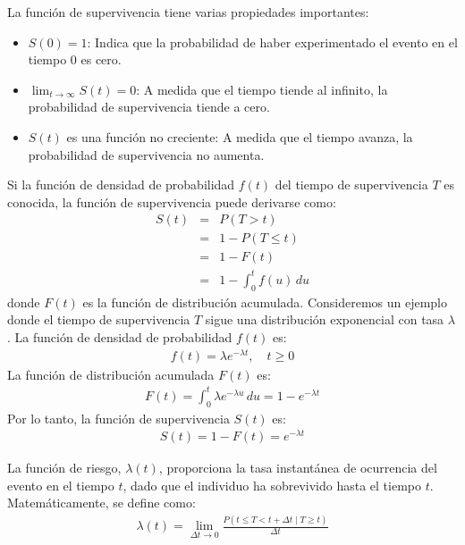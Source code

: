 \documentclass[a4paper]{report} %
\begin{document}
La funci\'on de supervivencia tiene varias propiedades importantes:
\begin{itemize}
    \item $S(0) = 1$: Indica que la probabilidad de haber experimentado el evento en el tiempo 0 es cero.
    \item $\lim_{t \to \infty} S(t) = 0$: A medida que el tiempo tiende al infinito, la probabilidad de supervivencia tiende a cero.
    \item $S(t)$ es una funci\'on no creciente: A medida que el tiempo avanza, la probabilidad de supervivencia no aumenta.
\end{itemize}

Si la funci\'on de densidad de probabilidad $f(t)$ del tiempo de supervivencia $T$ es conocida, la funci\'on de supervivencia puede derivarse como:
\begin{eqnarray*}
S(t) &=& P(T > t) \\
     &=& 1 - P(T \leq t) \\
     &=& 1 - F(t) \\
     &=& 1 - \int_0^t f(u) \, du
\end{eqnarray*}
donde $F(t)$ es la funci\'on de distribuci\'on acumulada. Consideremos un ejemplo donde el tiempo de supervivencia $T$ sigue una distribuci\'on exponencial con tasa $\lambda$. La funci\'on de densidad de probabilidad $f(t)$ es:
\begin{eqnarray*}
f(t) = \lambda e^{-\lambda t}, \quad t \geq 0
\end{eqnarray*}
La funci\'on de distribuci\'on acumulada $F(t)$ es:
\begin{eqnarray*}
F(t) = \int_0^t \lambda e^{-\lambda u} \, du = 1 - e^{-\lambda t}
\end{eqnarray*}
Por lo tanto, la funci\'on de supervivencia $S(t)$ es:
\begin{eqnarray*}
S(t) = 1 - F(t) = e^{-\lambda t}
\end{eqnarray*}

La funci\'on de riesgo, $\lambda(t)$, proporciona la tasa instant\'anea de ocurrencia del evento en el tiempo $t$, dado que el individuo ha sobrevivido hasta el tiempo $t$. Matem\'aticamente, se define como:
\begin{eqnarray*}
\lambda(t) = \lim_{\Delta t \to 0} \frac{P(t \leq T < t + \Delta t \mid T \geq t)}{\Delta t}
\end{eqnarray*}
\end{document}
